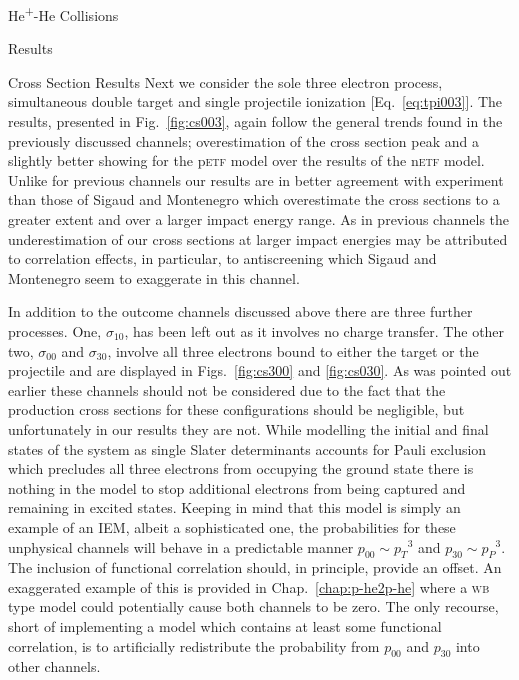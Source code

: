 \documentclass[letterpaper, 11 pt]{report}
\begin{document}
\begin{chapter}{\texorpdfstring{He\textsuperscript{+}}{He+}-He Collisions \label{chap:hephe}}
\begin{section}{Results \label{sec:hephe-disc}}
\begin{subsection}{Cross Section Results \label{sec:hephe-res}}
         Next we consider the sole three electron process, simultaneous double target and single
         projectile ionization [Eq.~\eqref{eq:tpi003}]. The results, presented in Fig.~\ref{fig:cs003},
         again follow the general trends found in the previously discussed channels; overestimation of
         the cross section peak and a slightly better showing for the p\textsc{etf} model over the
         results of the n\textsc{etf} model. Unlike for previous channels our results are in better
         agreement with experiment than those of Sigaud and Montenegro which overestimate the cross
         sections to a greater extent and over a larger impact energy range. As in previous channels the
         underestimation of our cross sections at larger impact energies may be attributed to
         correlation effects, in particular, to antiscreening which  Sigaud and Montenegro seem to
         exaggerate in this channel.

         In addition to the outcome channels discussed above there are three further processes. One,
         $\sigma_{10}$, has been left out as it involves no charge transfer. The other two,
         $\sigma_{00}$ and $\sigma_{30}$, involve all three electrons bound to either the target or the
         projectile and are displayed in Figs.~\ref{fig:cs300} and \ref{fig:cs030}. As was pointed out
         earlier these channels should not be considered due to the fact that the production cross
         sections for these configurations should be negligible, but unfortunately in our results they
         are not. While modelling the initial and final states of the system as single Slater
         determinants accounts for Pauli exclusion which precludes all three electrons from occupying
         the ground state there is nothing in the model to stop additional electrons from being captured
         and remaining in excited states. Keeping in mind that this model is simply an example of an
         \textsc{IEM}, albeit a sophisticated one, the probabilities for these unphysical channels will
         behave in a predictable manner $p_{00} \sim {p_T}^3$ and $p_{30} \sim {p_P}^3$. The inclusion
         of functional correlation should, in principle, provide an offset. An exaggerated example of
         this is provided in Chap.~\ref{chap:p-he2p-he} where a \textsc{wb} type model could potentially
         cause both channels to be zero. The only recourse, short of implementing a model which contains
         at least some functional correlation, is to artificially redistribute the probability from
         $p_{00}$ and $p_{30}$ into other channels.


\end{subsection}
\end{section}
\end{chapter}
\end{document}
